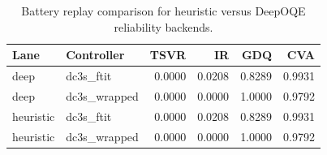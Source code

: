 \begin{table}[ht]
\centering
\caption{Battery replay comparison for heuristic versus DeepOQE reliability backends.}
\label{tab:battery-deep-oqe-safety}
\begin{tabular}{llrrrr}
\toprule
Lane & Controller & TSVR & IR & GDQ & CVA \\
\midrule
deep & dc3s\_ftit & 0.0000 & 0.0208 & 0.8289 & 0.9931 \\
deep & dc3s\_wrapped & 0.0000 & 0.0000 & 1.0000 & 0.9792 \\
heuristic & dc3s\_ftit & 0.0000 & 0.0208 & 0.8289 & 0.9931 \\
heuristic & dc3s\_wrapped & 0.0000 & 0.0000 & 1.0000 & 0.9792 \\
\bottomrule
\end{tabular}
\end{table}
